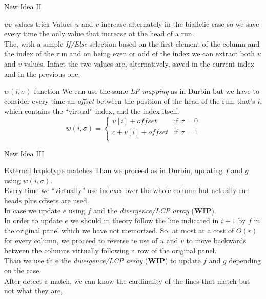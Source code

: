 \documentclass{beamer}
\begin{document}
\begin{frame}{New Idea II}
  \begin{block}{$uv$ values trick}
    Values $u$ and $v$ increase alternately in the biallelic case so we save
    every time the only value that increase at the head of a run.\\
    The, with a simple \textit{If/Else} selection based on the first element of
    the column and the index of the run and on being even or odd of the index we
    can extract both $u$ and $v$ values. Infact the two values are,
    alternatively, saved in the current index and in the previous one.
  \end{block}
   \begin{block}{$w(i,\sigma)$ function}
    We can use the same \textit{LF-mapping} as in Durbin but we have to consider
    every time an \textit{offset} between the position of the head of the run,
    that's $i$, which contains the ``virtual'' index, and the index itself.
    \[w(i,\sigma)=
      \begin{cases}
        u[i]+offset&\mbox{if } \sigma=0\\
        c+v[i]+offset&\mbox{if } \sigma=1\\
      \end{cases}
    \]
  \end{block}
\end{frame}
\begin{frame}{New Idea III}
  \begin{block}{External haplotype matches}
    Than we proceed as in Durbin, updating $f$ and $g$ using $w(i,\sigma)$.\\
    Every time we ``virtually'' use indexes over the whole column but actually
    run heads plus offsets are used. \\
    In case we update $e$ using $f$ and the \textit{divergence/LCP array}
    (\textbf{WIP}).\\
    In order to update $e$ we should in theory follow the line indicated in $i +
    1$ by $f$ in the original panel which we have not memorized. So, at most at
    a cost of $O(r)$ for every column, we proceed to reverse te use of $u$ and
    $v$ to move backwards between the columns virtually following a row of the
    original panel.\\
    Than we use th e the \textit{divergence/LCP array} (\textbf{WIP}) to update
    $f$ 
    and $g$ depending on the case.\\
    After detect a match, we can know the cardinality of the lines that match
    but not what they are, 
  \end{block}
\end{frame}
\end{document}
